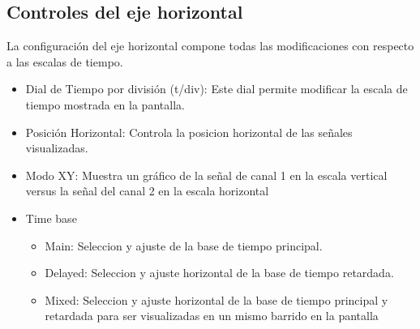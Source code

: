 \subsection{Controles del eje horizontal}
La configuración del eje horizontal compone todas las modificaciones con respecto a las escalas de tiempo.
\begin{itemize}
    \item Dial de Tiempo por división (t/div): Este dial permite modificar la escala de tiempo mostrada en la pantalla.
    \item Posición Horizontal: Controla la posicion horizontal de las señales visualizadas. 
    \item Modo XY: Muestra un gráfico de la señal de canal 1 en la escala vertical versus la señal del canal 2 en la escala horizontal
    \item Time base \begin{itemize}
        \item Main: Seleccion y ajuste de la base de tiempo principal.
        \item Delayed: Seleccion y ajuste horizontal de la base de tiempo retardada.
        \item Mixed: Seleccion y ajuste horizontal de la base de tiempo principal y retardada para ser visualizadas en un mismo barrido en la pantalla 
    \end{itemize}
\end{itemize}

